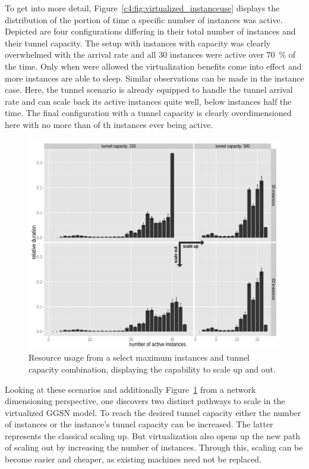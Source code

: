To get into more detail, Figure~\ref{c4:fig:virtualized_instanceuse} displays the distribution of the portion of time a specific number of instances was active. Depicted are four configurations differing in their total number of instances and their tunnel capacity. The setup with  instances with  capacity was clearly overwhelmed with the arrival rate and all 30 instances were active over \SI{70}{\percent} of the time. Only when  were allowed the virtualization benefits come into effect and more instances are able to sleep. Similar observations can be made in the  instance case.  Here, the  tunnel scenario is already equipped to handle the tunnel arrival rate and can scale back its active instances quite well, below  instances half the time. The final configuration with a  tunnel capacity is clearly overdimensioned here with no more than  of th  instances ever being active.

\begin{figure}[htb]
	\centering
	\includegraphics[width=1.0\textwidth]{images/R-virtualized-instanceuse-barplot.pdf}
	\caption{Resource usage from a select maximum instances and tunnel capacity combination, displaying the capability to scale up and out.}
\label{c4:fig:res-usage-barplot}
\end{figure}

Looking at these scenarios and additionally Figure~\ref{c4:fig:res-usage-barplot} from a network dimensioning perspective, one discovers two distinct pathways to scale in the virtualized \gls{GGSN} model. To reach the desired tunnel capacity either the number of instances or the instance's tunnel capacity can be increased. The latter represents the classical scaling up. But virtualization also opens up the new path of scaling out by increasing the number of instances. Through this, scaling can be become easier and cheaper, as existing machines need not be replaced.



